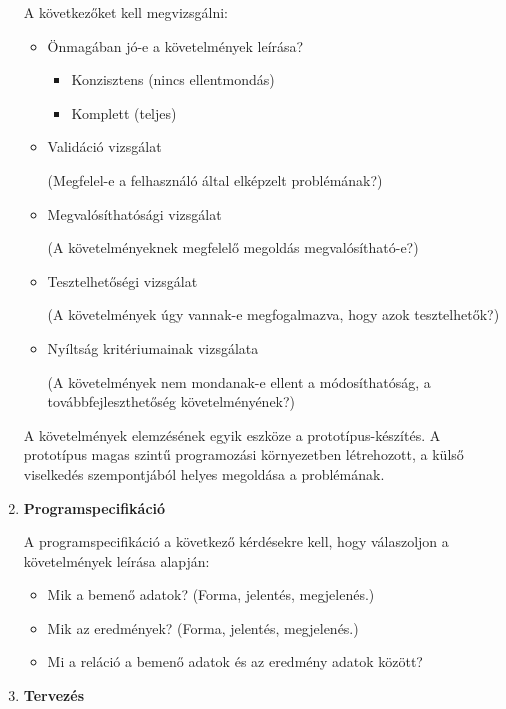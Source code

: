 \documentclass[12pt,margin=0px]{article}
\begin{document}
\begin{enumerate}
				A következőket kell megvizsgálni:
				\begin{itemize}
					\item Önmagában jó-e a követelmények leírása?
						\begin{itemize}
							\item Konzisztens (nincs ellentmondás)
							\item Komplett (teljes)
						\end{itemize}
						\item Validáció vizsgálat
						
						(Megfelel-e a felhasználó által elképzelt problémának?)
						
						\item Megvalósíthatósági vizsgálat
						
						(A követelményeknek megfelelő megoldás megvalósítható-e?)
						
						\item Tesztelhetőségi vizsgálat
						
						(A követelmények úgy vannak-e megfogalmazva, hogy azok tesztelhetők?)
						
						\item Nyíltság kritériumainak vizsgálata
						
						(A követelmények nem mondanak-e ellent a módosíthatóság, a továbbfejleszthetőség
						követelményének?)
				\end{itemize}
				
    \noindent A követelmények elemzésének egyik eszköze a prototípus-készítés. A prototípus magas szintű programozási környezetben létrehozott, a külső viselkedés szempontjából helyes megoldása a problémának.
			\item \textbf{Programspecifikáció}
			
				\noindent A programspecifikáció a következő kérdésekre kell, hogy válaszoljon a követelmények leírása alapján:
				
				\begin{itemize}
					\item Mik a bemenő adatok? (Forma, jelentés, megjelenés.)
					\item Mik az eredmények? (Forma, jelentés, megjelenés.)
					\item Mi a reláció a bemenő adatok és az eredmény adatok között?
				\end{itemize}
			\item \textbf{Tervezés}
			

\end{enumerate}
\end{document}
